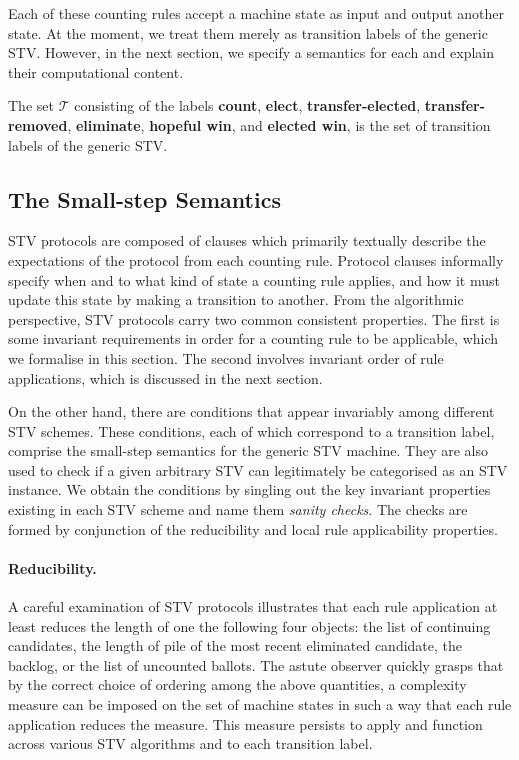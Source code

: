 \documentclass{llncs}
\begin{document}
Each of these counting rules accept a machine state as input and output another state. At the moment, we treat them merely as transition labels of the generic STV. However, in the next section, we specify a semantics for each and explain their computational content.
\begin{definition}\label{stv:trans}
The set $\mathcal{T}$ consisting of the labels \textbf{count}, \textbf{elect}, \textbf{transfer-elected}, \textbf{transfer-removed}, \textbf{eliminate}, \textbf{hopeful win}, and \textbf{elected win}, is the set of transition labels of the generic STV.
\end{definition}
\subsection{The Small-step Semantics}
STV protocols are composed of clauses which primarily textually describe the expectations of the protocol from each counting rule. Protocol clauses informally specify when and to what kind of state a counting rule applies, and how it must update this state by making a transition to another. From the algorithmic perspective, STV protocols carry two common   consistent properties. The first is some invariant requirements in order for a counting rule to be applicable, which we formalise in this section. The second involves invariant order of rule applications, which is discussed in the next section. 




On the other hand, there are conditions that appear invariably among different STV schemes. These conditions, each of which correspond to a transition label, comprise the small-step semantics for the generic STV machine. They are also used to check if a given arbitrary STV can legitimately be categorised as an STV instance. We obtain the conditions by singling out the key invariant properties existing in each STV scheme and name them \emph{sanity checks}. The checks are formed by conjunction of the reducibility and local rule applicability properties.
\paragraph{Reducibility.} 
A careful examination of STV protocols illustrates that each rule application at least reduces the length of one the following four objects: the list of continuing candidates, the length of pile of the most recent eliminated candidate,  the backlog, or the list of uncounted ballots. The astute observer quickly grasps that by the correct choice of ordering among the above quantities, a complexity measure can be imposed on the set of machine states in such a way that each rule application reduces the measure. This measure persists to apply and function across various STV algorithms and to each transition label.     
\end{document}
